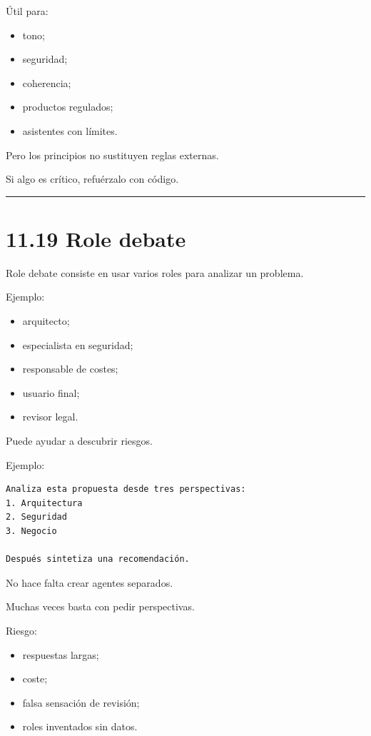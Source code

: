 Útil para:

\begin{itemize}
\tightlist
\item
  tono;
\item
  seguridad;
\item
  coherencia;
\item
  productos regulados;
\item
  asistentes con límites.
\end{itemize}

Pero los principios no sustituyen reglas externas.

Si algo es crítico, refuérzalo con código.

\begin{center}\rule{0.5\linewidth}{0.5pt}\end{center}

\section{11.19 Role debate}\label{role-debate}

Role debate consiste en usar varios roles para analizar un problema.

Ejemplo:

\begin{itemize}
\tightlist
\item
  arquitecto;
\item
  especialista en seguridad;
\item
  responsable de costes;
\item
  usuario final;
\item
  revisor legal.
\end{itemize}

Puede ayudar a descubrir riesgos.

Ejemplo:

\begin{lstlisting}
Analiza esta propuesta desde tres perspectivas:
1. Arquitectura
2. Seguridad
3. Negocio

Después sintetiza una recomendación.
\end{lstlisting}

No hace falta crear agentes separados.

Muchas veces basta con pedir perspectivas.

Riesgo:

\begin{itemize}
\tightlist
\item
  respuestas largas;
\item
  coste;
\item
  falsa sensación de revisión;
\item
  roles inventados sin datos.
\end{itemize}

